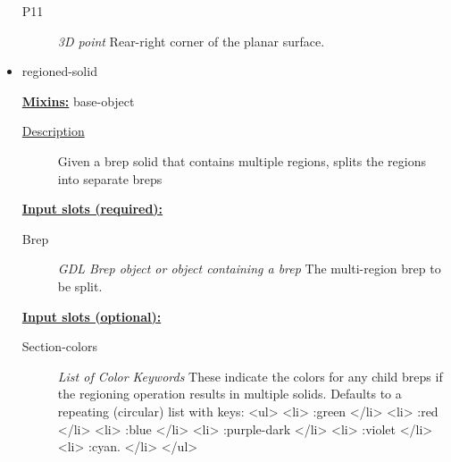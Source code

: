 \documentclass [11pt]{book}
\begin{document}
\begin{itemize}
\begin{description}
\item [P11]
\emph{3D point} Rear-right corner of the planar surface.


\end{description}







\item {}regioned-solid


\textbf{
\underline{Mixins:}} base-object





\begin{description}

\item [
\underline{Description}]


Given a brep solid that contains multiple regions, splits the regions into separate breps



\end{description}








\textbf{
\underline{Input slots (required):}}

\begin{description}

\item [Brep]
\emph{GDL Brep object or object containing a brep} The multi-region brep to be split.


\end{description}






\textbf{
\underline{Input slots (optional):}}

\begin{description}

\item [Section-colors]
\emph{List of Color Keywords} These indicate the colors for any child breps if the regioning operation results in
multiple solids. Defaults to a repeating (circular) list with keys:
<ul>
<li> :green </li>
<li> :red </li>
<li> :blue </li>
<li> :purple-dark </li>
<li> :violet </li>
<li> :cyan. </li> </ul>


\end{description}








\end{itemize}
\end{document}
